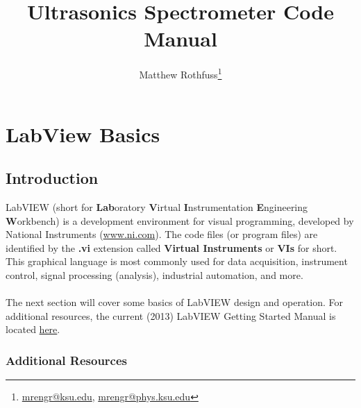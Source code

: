 \documentclass[letterpaper, twoside, openright]{report}
\begin{document}
\title{Ultrasonics Spectrometer Code Manual}
\author{Matthew Rothfuss\thanks{\href{mailto:mrengr@ksu.edu}{mrengr@ksu.edu}, \href{mailto:mrengr@phys.ksu.edu}{mrengr@phys.ksu.edu}}}

\maketitle




\tableofcontents


\chapter{LabView Basics}

\section{Introduction}

LabVIEW	(short	for	\textbf{Lab}oratory	\textbf{V}irtual	\textbf{I}nstrumentation	\textbf{E}ngineering	\textbf{W}orkbench) is a development environment for visual programming, developed by National Instruments (\href{http://www.ni.com/}{www.ni.com}). The code files (or program files) are identified by the \textbf{.vi} extension called \textbf{Virtual Instruments} or \textbf{VIs} for short. This graphical language is most commonly used for data acquisition, instrument control, signal processing (analysis), industrial automation, and more.
\\ \\
The next section will cover some basics of LabVIEW design and operation. For additional resources, the current (2013) LabVIEW Getting Started Manual is located \href{http://www.ni.com/pdf/manuals/373427j.pdf}{here}.

\subsection{Additional Resources}
\end{document}
